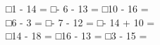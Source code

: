 \documentclass[uplatex,
paper=a4,
fontsize=18pt,
jafontsize=16pt,
number_of_lines=30,
line_length=30zh,
baselineskip=25pt,
]{jlreq}
\begin{document}
□\hspace{1em}1 - 14 =\hspace{2em} □\hspace{1em}- 6 - 13 =\hspace{2em} □\hspace{1em}10 - 16 =\hspace{2em} 
\\

□\hspace{1em}6 - 3 =\hspace{2em} □\hspace{1em}- 7 - 12 =\hspace{2em} □\hspace{1em}- 14 + 10 =\hspace{2em} 
\\

□\hspace{1em}14 - 18 =\hspace{2em} □\hspace{1em}16 - 13 =\hspace{2em} □\hspace{1em}3 - 15 =\hspace{2em} 
\\
\end{document}

